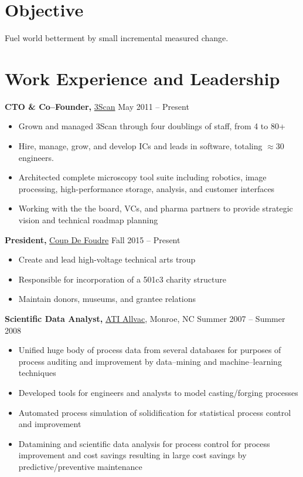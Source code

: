 \documentclass{res}
\begin{document}
\begin{resume}

\section{Objective}
Fuel world betterment by small incremental measured change.

\section{Work Experience and Leadership}

{\bf CTO \& Co--Founder,} \href{http://www.3scan.com}{3Scan} \hfill
May 2011 -- Present
\begin{itemize}  \itemsep -2pt
  \item Grown and managed 3Scan through four doublings of staff, from 4 to 80+
  \item Hire, manage, grow, and develop ICs and leads in software, totaling $\approx30$ engineers.
  \item Architected complete microscopy tool suite including robotics, image processing,
    high-performance storage, analysis, and customer interfaces
  \item Working with the the board, VCs, and pharma partners to provide strategic vision and technical roadmap planning  
\end{itemize}

{\bf President,}  \href{http://coupdefoud.re}{Coup De Foudre} \hfill   Fall 2015 -- Present
\begin{itemize} \itemsep -2pt
  \item Create and lead high-voltage technical arts troup
  \item Responsible for incorporation of a 501c3 charity structure
  \item Maintain donors, museums, and grantee relations
\end{itemize}

{\bf Scientific Data Analyst,} \href{https://www.atimetals.com/}{ATI Allvac}, Monroe, NC \hfill
Summer 2007 -- Summer 2008
\begin{itemize} \itemsep -2pt
  \item Unified huge body of process data from several databases for purposes of
    process auditing and improvement by data--mining and machine--learning techniques
  \item Developed tools for engineers and analysts to model casting/forging processes
  \item Automated process simulation of solidification for statistical process control and improvement
  \item Datamining and scientific data analysis for process control for process improvement and cost savings
    resulting in large cost savings by predictive/preventive maintenance
\end{itemize}


\end{resume}
\end{document}
